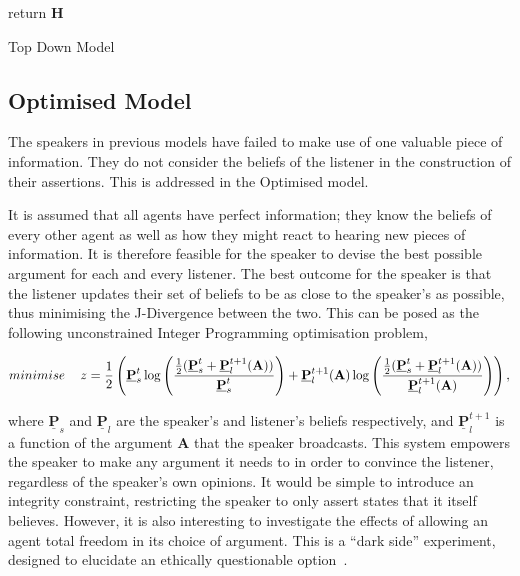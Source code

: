 \begin{algorithm}[H]
\SetAlgoLined
{}
 return $\mathbf{H}$\;
 \caption{Top Down Model} \label{alg:TD}
\end{algorithm}

\subsection*{Optimised Model}

The speakers in previous models have failed to make use of one valuable piece of information. They do not consider the beliefs of the listener in the construction of their assertions. This is addressed in the Optimised model. 

It is assumed that all agents have perfect information; they know the beliefs of every other agent as well as how they might react to hearing new pieces of information. It is therefore feasible for the speaker to devise the best possible argument for each and every listener. The best outcome for the speaker is that the listener updates their set of beliefs to be as close to the speaker's as possible, thus minimising the J-Divergence between the two. This can be posed as the following unconstrained Integer Programming optimisation problem, 

\begin{equation}
    minimise \hspace{1.2em} z = \frac{1}{2} \left( \underline{\mathbf{P}}^t_s \log \left( \frac{ \frac{1}{2} (\underline{\mathbf{P}}^t_s + \underline{\mathbf{P}}^{t+1}_l(\mathbf{A})) }{\underline{\mathbf{P}}^t_s} \right) +  \underline{\mathbf{P}}^{t+1}_l(\mathbf{A}) \log \left( \frac{ \frac{1}{2} (\underline{\mathbf{P}}^t_s + \underline{\mathbf{P}}^{t+1}_l(\mathbf{A})) }{\underline{\mathbf{P}}^{t+1}_l(\mathbf{A})} \right)     \right),
\end{equation}

where $\underline{ \mathbf{P}}_s$ and $\underline{\mathbf{P}}_l$ are the speaker's and listener's beliefs respectively, and $\underline{\mathbf{P}}_l^{t+1}$ is a function of the argument $\mathbf{A}$ that the speaker broadcasts. This system empowers the speaker to make any argument it needs to in order to convince the listener, regardless of the speaker's own opinions. It would be simple to introduce an integrity constraint, restricting the speaker to only assert states that it itself believes. However, it is also interesting to investigate the effects of allowing an agent total freedom in its choice of argument. This is a ``dark side'' experiment, designed to elucidate an ethically questionable option~\cite{Berdichievsky1999TowardsTechnology}. 


